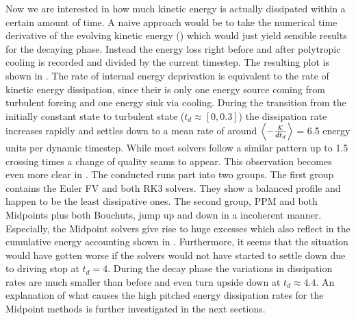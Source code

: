  Now we
are interested in how much kinetic energy is actually dissipated within a
certain amount of time. A naive approach would be to take the numerical time
derivative of the evolving kinetic energy
() which would just yield
sensible results for the decaying phase. Instead the energy loss right before
and after polytropic cooling is recorded and divided by the current timestep.
The resulting plot is shown in
.  The rate of internal
energy deprivation is equivalent to the rate of kinetic energy dissipation,
since their is only one energy source coming from turbulent forcing and one
energy sink via cooling. During the transition from the initially constant
state to turbulent state ($t_d \approx [0,0.3]$) the dissipation rate increases
rapidly and settles down to a mean rate of around $\left\langle-\frac{\mathcal{K}}{dt_d}\right\rangle$ = 6.5
energy units per dynamic timestep. While most solvers follow a similar pattern
up to 1.5 crossing times a change of quality seams to appear. This observation
becomes even more clear in .  The
conducted runs part into two groups. The first group contains the Euler FV and
both RK3 solvers. They show a balanced profile and happen to be the least
dissipative ones. The second group, PPM and both Midpoints plus both Bouchuts,
jump up and down in a incoherent manner. Especially, the Midpoint solvers give rise
to huge excesses which also reflect in the cumulative energy accounting shown
in . Furthermore,
it seems that the situation would have gotten worse if the solvers would not
have started to settle down due to driving stop at $t_d = 4$. During the decay
phase the variations in dissipation rates are much smaller than before and even
turn upside down at $t_d \approx 4.4$. An explanation of what causes the high
pitched energy dissipation rates for the Midpoint methods is further
investigated in the next sections.



